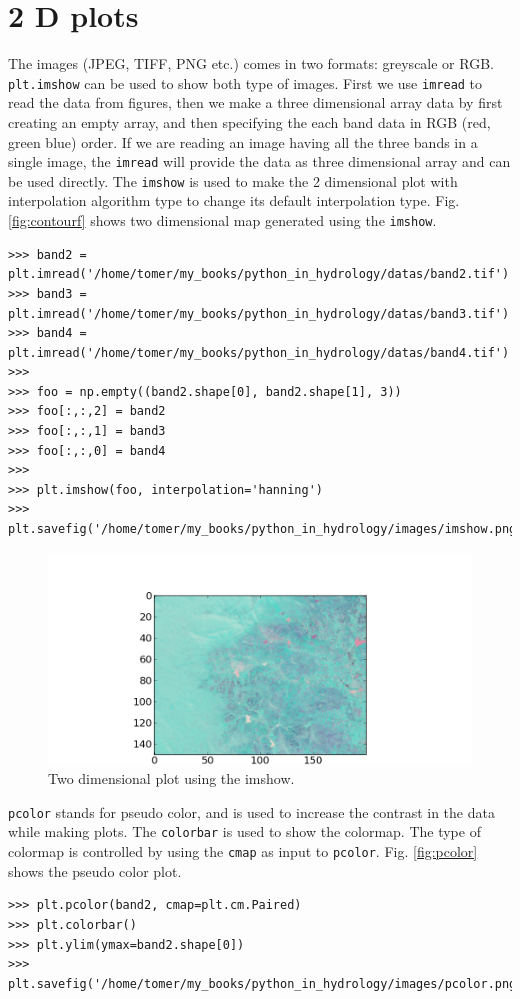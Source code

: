 \documentclass[10pt]{book}
\begin{document}
\section{2 D plots}
The images (JPEG, TIFF, PNG etc.) comes in two formats: greyscale or RGB. \verb"plt.imshow" can be used to show both type of images. First we use \verb"imread" to read the data from figures, then we make a three dimensional array data by first creating an empty array, and then specifying the each band data in RGB (red, green blue) order. If we are reading an image having all the three bands in a single image, the \verb"imread" will provide the data as three dimensional array and can be used directly. The \verb"imshow" is used to make the 2 dimensional plot with interpolation algorithm type to change its default interpolation type. Fig. \ref{fig:contourf} shows two dimensional map generated using the \verb"imshow". 
\beforeverb
\begin{verbatim}
>>> band2 = plt.imread('/home/tomer/my_books/python_in_hydrology/datas/band2.tif')
>>> band3 = plt.imread('/home/tomer/my_books/python_in_hydrology/datas/band3.tif')
>>> band4 = plt.imread('/home/tomer/my_books/python_in_hydrology/datas/band4.tif')
>>> 
>>> foo = np.empty((band2.shape[0], band2.shape[1], 3))
>>> foo[:,:,2] = band2
>>> foo[:,:,1] = band3
>>> foo[:,:,0] = band4
>>> 
>>> plt.imshow(foo, interpolation='hanning')
>>> plt.savefig('/home/tomer/my_books/python_in_hydrology/images/imshow.png')
\end{verbatim}
\afterverb
{}

\beforefig
\begin{figure}[h!]
  \centering
    \includegraphics[scale=0.5]{images/imshow.png}
  \caption{Two dimensional plot using the imshow.}
   \label{fig:imshow}
\end{figure}
\afterfig

\verb"pcolor" stands for pseudo color, and is used to increase the contrast in the data while making plots. The \verb"colorbar" is used to show the colormap. The type of colormap is controlled by using the \verb"cmap" as input to \verb"pcolor". Fig. \ref{fig:pcolor} shows the pseudo color plot. 
\beforeverb \begin{verbatim}
>>> plt.pcolor(band2, cmap=plt.cm.Paired)
>>> plt.colorbar()
>>> plt.ylim(ymax=band2.shape[0])
>>> plt.savefig('/home/tomer/my_books/python_in_hydrology/images/pcolor.png')
\end{verbatim} \afterverb
{}
\end{document}
